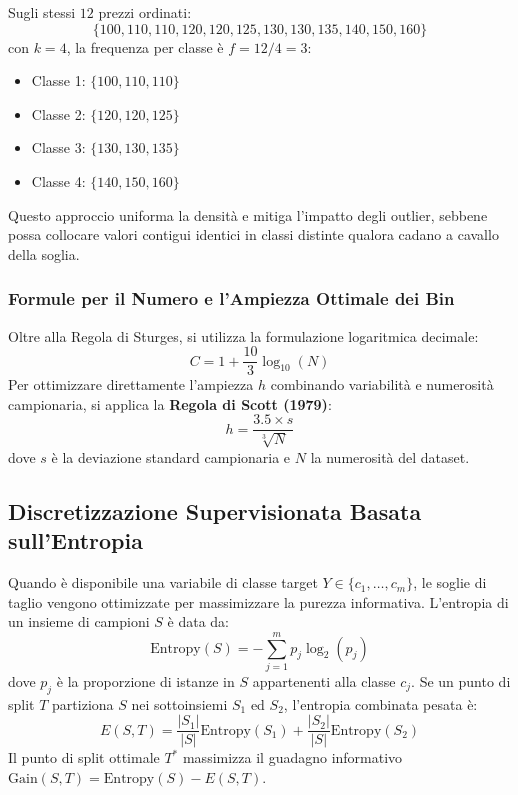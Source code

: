 Sugli stessi $12$ prezzi ordinati:
\begin{equation*}
    \{100, 110, 110, 120, 120, 125, 130, 130, 135, 140, 150, 160\}
\end{equation*}
con $k=4$, la frequenza per classe è $f = 12/4 = 3$:
\begin{itemize}[noitemsep]
    \item Classe 1: $\{100, 110, 110\}$
    \item Classe 2: $\{120, 120, 125\}$
    \item Classe 3: $\{130, 130, 135\}$
    \item Classe 4: $\{140, 150, 160\}$
\end{itemize}
Questo approccio uniforma la densità e mitiga l'impatto degli outlier, sebbene possa collocare valori contigui identici in classi distinte qualora cadano a cavallo della soglia.

\subsubsection{Formule per il Numero e l'Ampiezza Ottimale dei Bin}
Oltre alla Regola di Sturges, si utilizza la formulazione logaritmica decimale:
\begin{equation}
    C = 1 + \frac{10}{3} \log_{10}(N)
\end{equation}
Per ottimizzare direttamente l'ampiezza $h$ combinando variabilità e numerosità campionaria, si applica la \textbf{Regola di Scott (1979)}:
\begin{equation}
    h = \frac{3.5 \times s}{\sqrt[3]{N}}
\end{equation}
dove $s$ è la deviazione standard campionaria e $N$ la numerosità del dataset.

\FloatBarrier
\subsection{Discretizzazione Supervisionata Basata sull'Entropia}

Quando è disponibile una variabile di classe target $Y \in \{c_1, \dots, c_m\}$, le soglie di taglio vengono ottimizzate per massimizzare la purezza informativa.
L'entropia di un insieme di campioni $S$ è data da:
\begin{equation}
    \text{Entropy}(S) = - \sum_{j=1}^m p_j \log_2(p_j)
\end{equation}
dove $p_j$ è la proporzione di istanze in $S$ appartenenti alla classe $c_j$. Se un punto di split $T$ partiziona $S$ nei sottoinsiemi $S_1$ ed $S_2$, l'entropia combinata pesata è:
\begin{equation}
    E(S, T) = \frac{|S_1|}{|S|} \text{Entropy}(S_1) + \frac{|S_2|}{|S|} \text{Entropy}(S_2)
\end{equation}
Il punto di split ottimale $T^*$ massimizza il guadagno informativo $\text{Gain}(S, T) = \text{Entropy}(S) - E(S, T)$.

